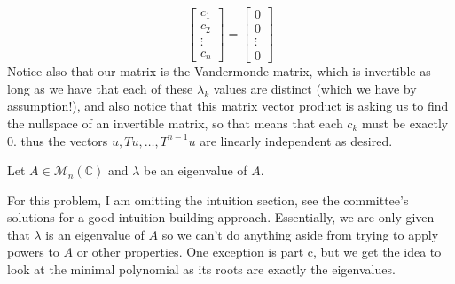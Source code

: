 \documentclass[answers]{exam}
\begin{document}
\begin{questions}
\begin{parts}
\begin{solution}
\[\begin{bmatrix}
                    c_1\\
                    c_2\\
                    \vdots\\
                    c_n
                \end{bmatrix} = \begin{bmatrix}
                    0\\
                    0\\
                    \vdots\\
                    0
                \end{bmatrix}
            \]
            Notice also that our matrix is the Vandermonde matrix, which is invertible as long as we have that
            each of these $\lambda_k$ values are distinct (which we have by assumption!), and also notice that 
            this matrix vector product is asking us to find the nullspace of an invertible matrix, so that means
            that each $c_k$ must be exactly $0$. thus the vectors $u,Tu,\dots,T^{n-1}u$ are linearly independent
            as desired. 
        \end{solution}
    \end{parts}
    \question Let $A\in\mathcal{M}_n\left(\mathbb{C}\right)$ and $\lambda$ be an eigenvalue of $A$.
    \begin{solution}
        For this problem, I am omitting the intuition section, see the committee's solutions for a good
        intuition building approach. Essentially, we are only given that $\lambda$ is an eigenvalue of $A$
        so we can't do anything aside from trying to apply powers to $A$ or other properties. One exception is 
        part c, but we get the idea to look at the minimal polynomial as its roots are exactly the eigenvalues.
    \end{solution}
\end{questions}
\end{document}
